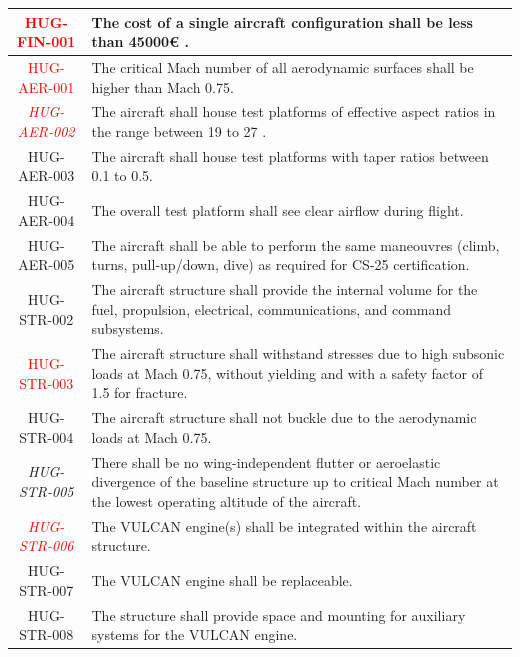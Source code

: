 \begin{longtable}{|c|p{13cm}|}
\textcolor{red}{HUG-FIN-001} & The cost of a single aircraft configuration shall be less than 45000€ \cite{Castro2026}.\\ \hline

\textcolor{red}{HUG-AER-001}& The critical Mach number of all aerodynamic surfaces shall be higher than Mach 0.75.\\ \hline 

\textcolor{red}{\textit{HUG-AER-002}}& The aircraft shall house test platforms of effective aspect ratios in the range between 19 to 27 \cite{Aerodynamic_Analysis}.\\ \hline

HUG-AER-003& The aircraft shall house test platforms with taper ratios between 0.1 to 0.5.\\ \hline 

HUG-AER-004& The overall test platform shall see clear airflow during flight.\\ \hline 

HUG-AER-005& The aircraft shall be able to perform the same maneouvres (climb, turns, pull-up/down, dive) as required for CS-25 certification.\\ \hline 

HUG-STR-002 & The aircraft structure shall provide the internal volume for the fuel, propulsion, electrical, communications, and command subsystems.\\ \hline

\textcolor{red}{HUG-STR-003}& The aircraft structure shall withstand stresses due to high subsonic loads at Mach 0.75, without yielding and with a safety factor of 1.5 for fracture.\\ \hline 

HUG-STR-004& The aircraft structure shall not buckle due to the aerodynamic loads at Mach 0.75.\\ \hline 

\textit{HUG-STR-005}& There shall be no wing-independent flutter or aeroelastic divergence of the baseline structure up to critical Mach number at the lowest operating altitude of the aircraft.\\ \hline 

\textit{\textcolor{red}{HUG-STR-006}}& The VULCAN engine(s) shall be integrated within the aircraft structure. \\ \hline

HUG-STR-007& The VULCAN engine shall be replaceable. \\ \hline

HUG-STR-008& The structure shall provide space and mounting for auxiliary systems for the VULCAN engine. \\ \hline


\end{longtable}
